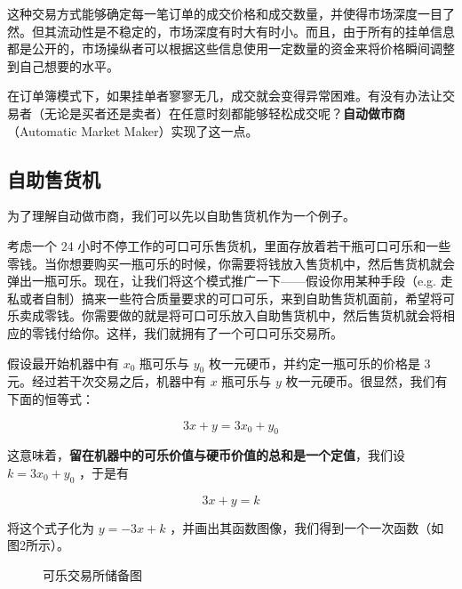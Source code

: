 \documentclass[12pt, a4paper, oneside]{ctexart}
\begin{document}
这种交易方式能够确定每一笔订单的成交价格和成交数量，并使得市场深度一目了然。但其流动性是不稳定的，市场深度有时大有时小。而且，由于所有的挂单信息都是公开的，市场操纵者可以根据这些信息使用一定数量的资金来将价格瞬间调整到自己想要的水平。

在订单簿模式下，如果挂单者寥寥无几，成交就会变得异常困难。有没有办法让交易者（无论是买者还是卖者）在任意时刻都能够轻松成交呢？\textbf{自动做市商}（Automatic Market Maker）实现了这一点。

\subsection{自助售货机}

为了理解自动做市商，我们可以先以自助售货机作为一个例子。

考虑一个 24 小时不停工作的可口可乐售货机，里面存放着若干瓶可口可乐和一些零钱。当你想要购买一瓶可乐的时候，你需要将钱放入售货机中，然后售货机就会弹出一瓶可乐。现在，让我们将这个模式推广一下——假设你用某种手段（e.g. 走私或者自制）搞来一些符合质量要求的可口可乐，来到自助售货机面前，希望将可乐卖成零钱。你需要做的就是将可口可乐放入自助售货机中，然后售货机就会将相应的零钱付给你。这样，我们就拥有了一个可口可乐交易所。

假设最开始机器中有 $x_0$ 瓶可乐与 $y_0$ 枚一元硬币，并约定一瓶可乐的价格是 3 元。经过若干次交易之后，机器中有 $x$ 瓶可乐与 $y$ 枚一元硬币。很显然，我们有下面的恒等式：

\begin{equation}
    3x + y = 3x_0 + y_0
\end{equation}

这意味着，\textbf{留在机器中的可乐价值与硬币价值的总和是一个定值}，我们设 $k=3x_0+y_0$ ，于是有

\begin{equation}
    3x + y = k
\end{equation}

将这个式子化为 $y = -3x + k$ ，并画出其函数图像，我们得到一个一次函数（如图2所示）。

\begin{figure}[htbp]
    \centering
    \caption{可乐交易所储备图}
\end{figure}
\end{document}
